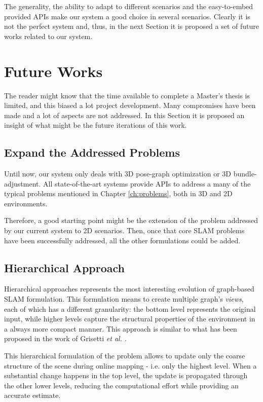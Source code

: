 \noindent The generality, the ability to adapt to different scenarios and the easy-to-embed provided APIs make our system a good choice in several scenarios. Clearly it is not the perfect system and, thus, in the next Section it is proposed a set of future works related to our system.

\section{Future Works}\label{sec:future_works}
The reader might know that the time available to complete a Master's thesis is limited, and this biased a lot project development. Many compromises have been made and a lot of aspects are not addressed. In this Section it is proposed an insight of what might be the future iterations of this work.

\subsection{Expand the Addressed Problems}
Until now, our system only deals with 3D pose-graph optimization or 3D bundle-adjustment. All state-of-the-art systems provide APIs to address a many of the typical problems mentioned in Chapter \ref{ch:problems}, both in 3D and 2D environments.

Therefore, a good starting point might be the extension of the problem addressed by our current system to 2D scenarios. Then, once that core SLAM problems have been successfully addressed, all the other formulations could be added.

\subsection{Hierarchical Approach}
Hierarchical approaches represents the most interesting evolution of graph-based SLAM formulation. This formulation means to create multiple graph's \textit{views}, each of which has a different granularity: the bottom level represents the original input, while higher levels capture the structural properties of the environment in a always more compact manner. This approach is similar to what has been proposed in the work of Grisetti \textit{et al.} \cite{grisetti2010hogman}.

This hierarchical formulation of the problem allows to update only the coarse structure of the scene during online mapping - i.e. only the highest level. When a substantial change happens in the top level, the update is propagated through the other lower levels, reducing the computational effort while providing an accurate estimate.